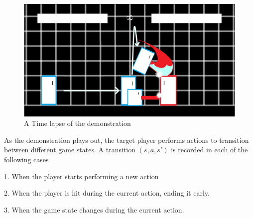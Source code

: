 \begin{figure}[h]
	\centering
	\includegraphics[scale=0.5]{Figures/Demonstration.png}
	\caption{A Time lapse of the demonstration}
	\label{ActionEffects}
\end{figure}

As the demonstration plays out, the target player performs actions to transition between different game states. A transition $(s,a,s')$ is recorded in each of the following cases

1. When the player starts performing a new action

2. When the player is hit during the current action, ending it early. 

3. When the game state changes during the current action.

